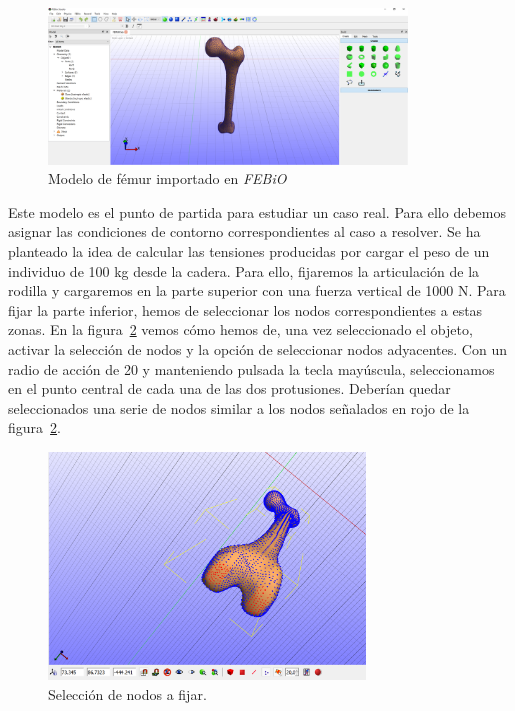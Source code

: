 \begin{figure}[!htp]
\centering
\includegraphics[width=0.85\textwidth]{figuras_2/femur1.png}
\caption{Modelo de fémur importado en \emph{FEBiO}}
\label{fig:femur1}
\end{figure}

Este modelo es el punto de partida para estudiar un caso real. Para ello debemos asignar las condiciones de contorno correspondientes al caso a resolver. Se ha planteado la idea de calcular las tensiones producidas por cargar el peso de un individuo de 100 kg desde la cadera. Para ello, fijaremos la articulación de la rodilla y cargaremos en la parte superior con una fuerza vertical de 1000 N. Para fijar la parte inferior, hemos de seleccionar los nodos correspondientes a estas zonas. En la figura~\ref{fig:femur2} vemos cómo hemos de, una vez seleccionado el objeto, activar la selección de nodos y la opción de seleccionar nodos adyacentes. Con un radio de acción de 20 y manteniendo pulsada la tecla mayúscula, seleccionamos en el punto central de cada una de las dos protusiones. Deberían quedar seleccionados una serie de nodos similar a los nodos señalados en rojo de la figura~\ref{fig:femur2}.

\begin{figure}[!htp]
\centering
\includegraphics[width=0.75\textwidth]{figuras_2/femur2.png}
\caption{Selección de nodos a fijar.}
\label{fig:femur2}
\end{figure}
 
